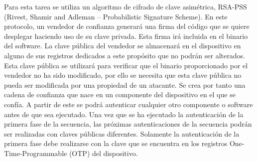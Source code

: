 Para esta tarea se utiliza un algoritmo de cifrado de clave asimétrica, RSA-PSS (Rivest, Shamir and Adleman – Probabilistic Signature Scheme). En este protocolo, un vendedor de confianza generará una firma del código que se quiere desplegar haciendo uso de su clave privada. Esta firma irá incluida en el binario del software. La clave pública del vendedor se almacenará en el dispositivo en alguno de sus registros dedicados a este propósito que no podrán ser alterados. Esta clave pública se utilizará para verificar que el binario proporcionado por el vendedor no ha sido modificado, por ello se necesita que esta clave pública no pueda ser modificada por una propiedad de un atacante.
Se crea por tanto una cadena de confianza que nace en un componente del dispositivo en el que se confía. A partir de este se podrá autenticar cualquier otro componente o software antes de que sea ejecutado. Una vez que se ha ejecutado la autenticación de la primera fase de la secuencia, las próximas autenticaciones de la secuencia podrán ser realizadas con claves públicas diferentes. Solamente la autenticación de la primera fase debe realizarse con la clave que se encuentra en los registros One-Time-Programmable (OTP) del dispositivo.




